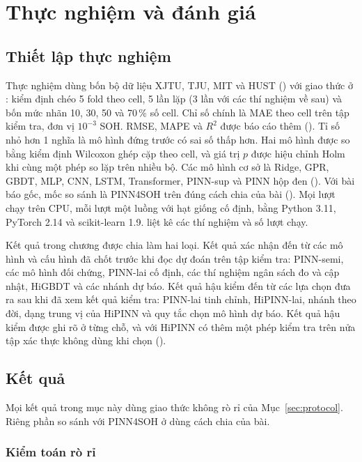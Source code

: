 \chapter{Thực nghiệm và đánh giá}
\label{chap:evaluation}\label{ch:ketqua}

\section{Thiết lập thực nghiệm}\label{sec:thietlap}

Thực nghiệm dùng bốn bộ dữ liệu XJTU, TJU, MIT và HUST () với giao thức ở : kiểm
định chéo 5 fold theo cell, 5 lần lặp (3 lần với các thí nghiệm về sau) và bốn mức nhãn 10, 30, 50 và 70\,\% số cell.
Chỉ số chính là MAE theo cell trên tập kiểm tra, đơn vị $10^{-3}$ SOH. RMSE, MAPE và $R^2$ được báo cáo thêm
(). Tỉ số nhỏ hơn 1 nghĩa là mô hình đứng trước có sai số thấp hơn. Hai mô hình được so bằng kiểm
định Wilcoxon ghép cặp theo cell, và giá trị $p$ được hiệu chỉnh Holm khi cùng một phép so lặp trên nhiều bộ. Các mô hình
cơ sở là Ridge, GPR, GBDT, MLP, CNN, LSTM, Transformer, PINN-sup và PINN hộp đen (). Với bài báo gốc, mốc
so sánh là PINN4SOH trên đúng cách chia của bài (). Mọi lượt chạy trên CPU, mỗi lượt một luồng với hạt
giống cố định, bằng Python 3.11, PyTorch 2.14 và scikit-learn 1.9.  liệt kê các thí nghiệm và số lượt
chạy.

Kết quả trong chương được chia làm hai loại. Kết quả xác nhận đến từ các mô hình và cấu hình đã chốt trước khi đọc dự đoán
trên tập kiểm tra: PINN-semi, các mô hình đối chứng, PINN-lai cố định, các thí nghiệm ngân sách đo và cập nhật, HiGBDT và
các nhánh dự báo. Kết quả hậu kiểm đến từ các lựa chọn đưa ra sau khi đã xem kết quả kiểm tra: PINN-lai tinh chỉnh,
HiPINN-lai, nhánh theo đời, dạng trung vị của HiPINN và quy tắc chọn mô hình dự báo. Kết quả hậu kiểm được ghi rõ ở từng
chỗ, và với HiPINN có thêm một phép kiểm tra trên nửa tập xác thực không dùng khi chọn ().

\section{Kết quả}\label{sec:ketqua}

Mọi kết quả trong mục này dùng giao thức không rò rỉ của Mục~\ref{sec:protocol}. Riêng phần so sánh với PINN4SOH ở
 dùng cách chia của bài.

\subsection{Kiểm toán rò rỉ}\label{sec:leakres}

